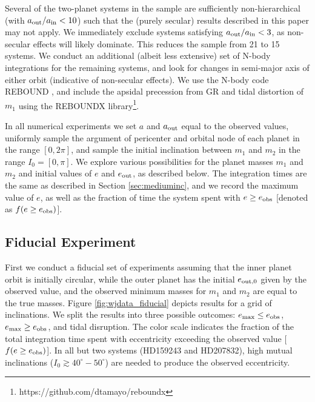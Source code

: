 \documentclass[12pt,useAMS, usenatbib]{mn2e}
\newcommand{\Max}{{\rm max}}
\newcommand{\In}{{\rm in}}
\newcommand{\Out}{{\rm out}}
\newcommand{\eout}{e_\Out}
\newcommand{\emax}{e_\Max}
\newcommand{\eobs}{e_{\rm obs}}
\begin{document}
Several of the two-planet systems in the \cite{antonini2016} sample are sufficiently non-hierarchical (with $a_\Out/a_\In < 10$) such that the (purely secular) results described in this paper may not apply. We immediately exclude systems satisfying $a_\Out/a_\In < 3$, as non-secular effects will likely dominate.  This reduces the sample from 21 to 15 systems. We conduct an additional (albeit less extensive) set of N-body integrations for the remaining systems, and look for changes in semi-major axis of either orbit (indicative of non-secular effects).  We use the N-body code REBOUND \citep{rein2012}, and include the apsidal precession from GR and tidal distortion of $m_1$ using the REBOUNDX library\footnote{https://github.com/dtamayo/reboundx}. 

In all numerical experiments we set $a$ and $a_\Out$ equal to the observed values, uniformly sample the argument of pericenter and orbital node of each planet in the range $[0, 2 \pi]$, and sample the initial inclination between $m_1$ and $m_2$ in the range $I_0 = [0,\pi]$.  We explore various possibilities for the planet masses $m_1$ and $m_2$ and initial values of $e$ and $\eout$, as described below.  The integration times are the same as described in Section \ref{sec:mediuminc}, and we record the maximum value of $e$, as well as the fraction of time the system spent with $e \geq e_{\rm obs}$ [denoted as $f(e \geq e_{\rm obs})$].  

\subsection{Fiducial Experiment}
\label{sec:obsfiducial}
First we conduct a fiducial set of experiments assuming that the inner planet orbit is initially circular, while the outer planet has the initial $e_{\Out,0}$ given by the observed value, and the observed minimum masses for $m_1$ and $m_2$ are equal to the true masses. Figure \ref{fig:wjdata_fiducial} depicts results for a grid of inclinations.  We split the results into three possible outcomes:
$\emax \leq e_{\rm obs}$, $\emax \geq e_{\rm obs}$, and tidal disruption.  The color scale indicates the fraction of the total integration time spent with eccentricity exceeding the observed value [$f(e \geq \eobs)$].  In all but two systems (HD159243 and HD207832), high mutual inclinations ($I_0 \gtrsim 40^\circ - 50^\circ$) are needed to produce the observed eccentricity.
\end{document}
